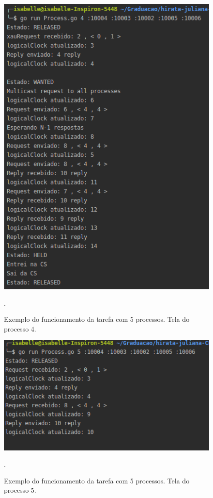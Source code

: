 \documentclass[conference]{IEEEtran}
\begin{document}
\begin{figure}[H]
\centering
\centerline{\includegraphics[scale=0.4]{imagens/ex2-proc4.png}}
\caption{Exemplo do funcionamento da tarefa com 5 processos. Tela do processo 4.}.
\label{ex2-proc4}
\end{figure}

\begin{figure}[H]
\centering
\centerline{\includegraphics[scale=0.4]{imagens/ex2-proc5.png}}
\caption{Exemplo do funcionamento da tarefa com 5 processos. Tela do processo 5.}.
\label{ex2-proc5}
\end{figure}
\end{document}
